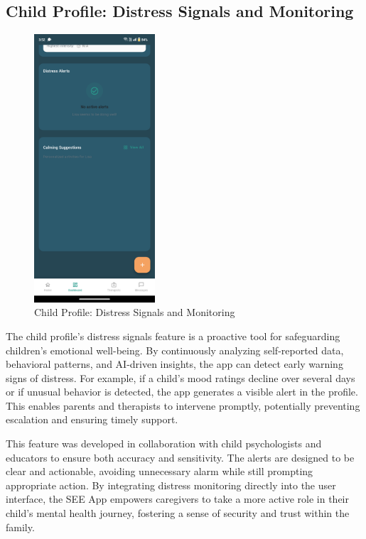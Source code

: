 ﻿\documentclass[12pt,a4paper]{article}
\newcommand{\sectiontitle}[1]{\subsection{#1}}
\begin{document}
\sectiontitle{Child Profile: Distress Signals and Monitoring}

\begin{figure}[H]
    \centering
    \includegraphics[width=0.4\textwidth]{Screenshots/restofchildprofilethatshowsthedistresssignals.png}
    \caption{Child Profile: Distress Signals and Monitoring}
    \label{fig:child-profile-distress}
\end{figure}
The child profile's distress signals feature is a proactive tool for safeguarding children's emotional well-being. By continuously analyzing self-reported data, behavioral patterns, and AI-driven insights, the app can detect early warning signs of distress. For example, if a child's mood ratings decline over several days or if unusual behavior is detected, the app generates a visible alert in the profile. This enables parents and therapists to intervene promptly, potentially preventing escalation and ensuring timely support.

This feature was developed in collaboration with child psychologists and educators to ensure both accuracy and sensitivity. The alerts are designed to be clear and actionable, avoiding unnecessary alarm while still prompting appropriate action. By integrating distress monitoring directly into the user interface, the SEE App empowers caregivers to take a more active role in their child's mental health journey, fostering a sense of security and trust within the family.
\end{document}
